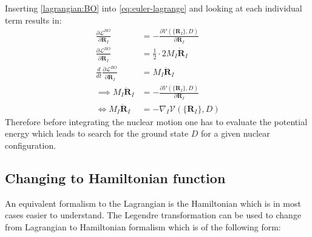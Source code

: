 \documentclass[12pt]{scrartcl}
\begin{document}
Inserting \ref{lagrangian:BO} into \ref{eq:euler-lagrange} and looking at each individual term results in:
\begin{align*}
\frac{\partial \mathcal{L}^{BO}}{\partial \mathbf{R}_I} &= - \frac{\partial \mathcal{V}(\{\mathbf{R}_I\},D)}{\partial \mathbf{R}_I}\\
\frac{\partial \mathcal{L}^{BO}}{\partial \dot{\mathbf{R}}_I} &= \frac{1}{2}\cdot 2 M_I \dot{\mathbf{R}}_I\\
\frac{d}{dt} \frac{\partial \mathcal{L}^{BO}}{\partial \dot{\mathbf{R}}_I} &= M_I \ddot{\mathbf{R}}_I\\
\implies M_I \ddot{\mathbf{R}}_I &= - \frac{\partial \mathcal{V}(\{\mathbf{R}_I\},D)}{\partial \mathbf{R}_I}\\
\iff M_I \ddot{\mathbf{R}}_I &= - \nabla_I \mathcal{V}(\{\mathbf{R}_I\},D)
\end{align*}
Therefore before integrating the nuclear motion one has to evaluate the potential energy which leads to search for the ground state $D$ for a given nuclear configuration.

\subsection{Changing to Hamiltonian function}
An equivalent formalism to the Lagrangian is the Hamiltonian which is in most cases easier to understand. The Legendre transformation can be used to change from Lagrangian to Hamiltonian formalism which is of the following form:
\end{document}
